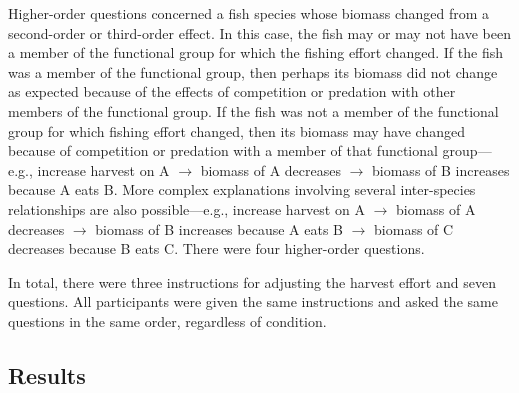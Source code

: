 Higher-order questions concerned a fish species whose biomass changed from a second-order or third-order effect.  In this case, the fish may or may not have been a member of the functional group for which the fishing effort changed.  If the fish was a member of the functional group, then perhaps its biomass did not change as expected because of the effects of competition or predation with other members of the functional group.  If the fish was not a member of the functional group for which fishing effort changed, then its biomass may have changed because of competition or predation with a member of that functional group---e.g., increase harvest on A $\rightarrow$ biomass of A decreases $\rightarrow$ biomass of B increases because A eats B.  More complex explanations involving several inter-species relationships are also possible---e.g., increase harvest on A $\rightarrow$ biomass of A decreases $\rightarrow$ biomass of B increases because A eats B $\rightarrow$ biomass of C decreases because B eats C.  There were four higher-order questions. 

In total, there were three instructions for adjusting the harvest effort and seven questions.  All participants were given the same instructions and asked the same questions in the same order, regardless of condition.

\subsection{Results}

